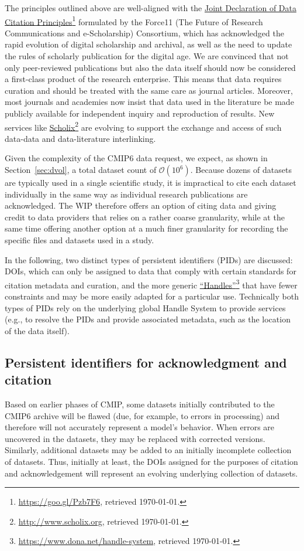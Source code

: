 \documentclass[gmd,manuscript]{copernicus}
\newcommand{\pllabel}[1]{\label{p-#1}\linelabel{l-#1}}
\newcommand{\urlref}[2] {\href{#1}{#2}\footnote{\url{#1}, retrieved \today.}}
\begin{document}
The principles outlined above are well-aligned with the
\urlref{https://goo.gl/Pzb7F6}{Joint Declaration of Data Citation
Principles} formulated by the Force11 (The Future of Research
Communications and e-Scholarship) Consortium, which has acknowledged
the rapid evolution of digital scholarship and archival, as well as
the need to update the rules of scholarly publication for the digital
age. We are convinced that not only peer-reviewed publications but
also the data itself should now be considered a first-class product of
the research enterprise. This means that data requires curation and
should be treated with the same care as journal articles. Moreover,
most journals and academies now insist that data used in the
literature be made publicly available for independent inquiry and
reproduction of results. New services like
\urlref{http://www.scholix.org}{Scholix} are evolving to support the
exchange and access of such data-data and data-literature
interlinking.

Given the complexity of the CMIP6 data request, we expect, as shown in
Section~\ref{sec:dvol}, a total dataset count of $\mathcal{O}(10^6)$. Because
dozens of datasets are typically used in a single scientific study, it
is impractical to cite each dataset individually in the same way as
individual research publications are acknowledged. The WIP therefore
offers an option of citing data and giving credit to data providers
that relies on a rather coarse granularity, while at the same time
offering another option at a much finer granularity for recording the
specific files and datasets used in a study.

In the following, two distinct types of persistent identifiers (PIDs)
are discussed: DOIs, which can only be assigned to data that comply
with certain standards for citation metadata and curation, and the
more generic
\pllabel{RC1-37}
\urlref{https://www.dona.net/handle-system}{``Handles''} that have
fewer constraints and may be more easily adapted for a particular use.
Technically both types of PIDs rely on the underlying global Handle
System to provide services (e.g., to resolve the PIDs and provide
associated metadata, such as the location of the data itself).

\subsection{Persistent identifiers for acknowledgment and citation}
\label{sec:doi}


Based on earlier phases of CMIP, some datasets initially contributed
to the CMIP6 archive will be flawed (due, for example, to errors in
processing) and therefore will not accurately represent a model's
behavior. When errors are uncovered in the datasets, they may be
replaced with corrected versions. Similarly, additional datasets may
be added to an initially incomplete collection of datasets. Thus,
initially at least, the DOIs assigned for the purposes of citation and
acknowledgement will represent an evolving underlying collection of
datasets.
\end{document}

